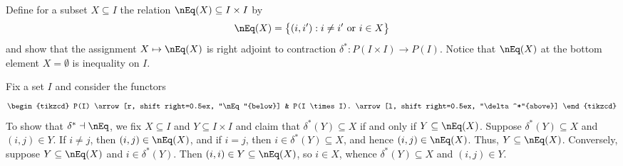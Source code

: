\begin{exercise}
Define for a subset \(X \subseteq I\) the relation \(\nEq(X) \subseteq I \times I\) by
\begin{equation*}
\nEq(X) = \big\{(i, i^\prime) : \text{\(i \neq i^\prime\) or \(i \in X\)}\big\}
\end{equation*}
and show that the assignment \(X \mapsto \nEq(X)\) is right adjoint to contraction \(\delta^* : P(I \times I) \to P(I)\).
Notice that \(\nEq(X)\) at the bottom element \(X = \emptyset\) is inequality on \(I\).
\end{exercise}

\begin{solution}
Fix a set \(I\) and consider the functors
\begin{equation*}
\begin{tikzcd}
P(I) \arrow[r, shift right=0.5ex, "\nEq"{below}] & P(I \times I). \arrow[l, shift right=0.5ex, "\delta^*"{above}]
\end{tikzcd}
\end{equation*}
To show that \(\delta^* \dashv \nEq\), we fix \(X \subseteq I\) and \(Y \subseteq I \times I\) and claim that
\(\delta^*(Y) \subseteq X\) if and only if \(Y \subseteq \nEq(X)\).
Suppose \(\delta^*(Y) \subseteq X\) and \((i, j) \in Y\).
If \(i \neq j\), then \((i, j) \in \nEq(X)\), and if \(i = j\), then \(i \in \delta^*(Y) \subseteq X\), and hence \((i, j) \in \nEq(X)\).
Thus, \(Y \subseteq \nEq(X)\).
Conversely, suppose \(Y \subseteq \nEq(X)\) and \(i \in \delta^*(Y)\).
Then \((i, i) \in Y \subseteq \nEq(X)\), so \(i \in X\), whence \(\delta^*(Y) \subseteq X\) and \((i, j) \in Y\).
\end{solution}